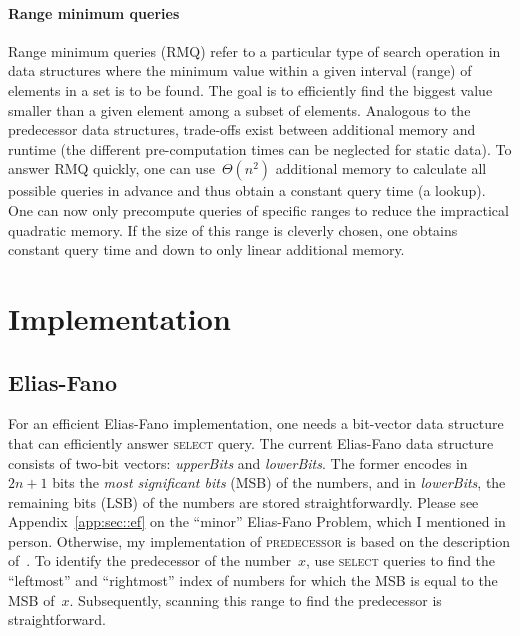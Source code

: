 \documentclass[a4paper,UKenglish,cleveref, autoref, thm-restate]{lipics-v2021}
\begin{document}
	\paragraph*{Range minimum queries}
	Range minimum queries (RMQ) refer to a particular type of search operation in data structures where the minimum value within a given interval (range) of elements in a set is to be found. The goal is to efficiently find the biggest value smaller than a given element among a subset of elements. Analogous to the predecessor data structures, trade-offs exist between additional memory and runtime (the different pre-computation times can be neglected for static data). To answer RMQ quickly, one can use~$\Theta\left(n^2\right)$ additional memory to calculate all possible queries in advance and thus obtain a constant query time (a lookup). One can now only precompute queries of specific ranges to reduce the impractical quadratic memory. If the size of this range is cleverly chosen, one obtains constant query time and down to only linear additional memory.
	
	\section{Implementation}
	
	\subsection{Elias-Fano}
	For an efficient Elias-Fano implementation, one needs a bit-vector data structure that can efficiently answer \textsc{select} query. The current Elias-Fano data structure consists of two-bit vectors: \textit{upperBits} and \textit{lowerBits}. The former encodes in~$2n+1$ bits the \textit{most significant bits} (MSB) of the numbers, and in \textit{lowerBits}, the remaining bits (LSB) of the numbers are stored straightforwardly. Please see Appendix~\ref{app:sec::ef} on the ``minor'' Elias-Fano Problem, which I mentioned in person. Otherwise, my implementation of \textsc{predecessor} is based on the description of~\cite{pibiri2020succinct}. To identify the predecessor of the number~$x$, use \textsc{select} queries to find the ``leftmost'' and ``rightmost'' index of numbers for which the MSB is equal to the MSB of~$x$. Subsequently, scanning this range to find the predecessor is straightforward.
\end{document}
